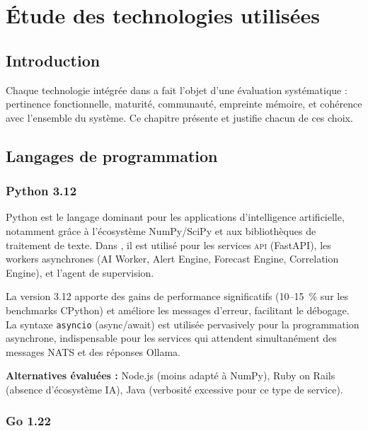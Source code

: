 \chapter{Étude des technologies utilisées}

\section*{Introduction}

Chaque technologie intégrée dans \caimp{} a fait l'objet d'une évaluation
systématique : pertinence fonctionnelle, maturité, communauté, empreinte
mémoire, et cohérence avec l'ensemble du système. Ce chapitre présente et
justifie chacun de ces choix.

\section{Langages de programmation}

\subsection{Python 3.12}

Python est le langage dominant pour les applications d'intelligence artificielle,
notamment grâce à l'écosystème NumPy/SciPy et aux bibliothèques de traitement
de texte. Dans \caimp{}, il est utilisé pour les services \textsc{api} (FastAPI),
les workers asynchrones (AI Worker, Alert Engine, Forecast Engine, Correlation Engine),
et l'agent de supervision.

La version 3.12 apporte des gains de performance significatifs (10--15~\% sur
les benchmarks CPython) et améliore les messages d'erreur, facilitant le débogage.
La syntaxe \texttt{asyncio} (async/await) est utilisée pervasively pour la
programmation asynchrone, indispensable pour les services qui attendent
simultanément des messages NATS et des réponses Ollama.

\textbf{Alternatives évaluées :} Node.js (moins adapté à NumPy), Ruby on Rails
(absence d'écosystème IA), Java (verbosité excessive pour ce type de service).

\subsection{Go 1.22}

